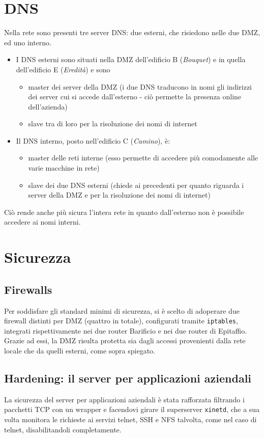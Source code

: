 \documentclass[a4paper,11pt]{article}
\def\code#1{\texttt{#1}}
\begin{document}
\section{DNS}
Nella rete sono presenti tre server DNS: due esterni, che risiedono nelle due DMZ, ed uno interno.\\
\begin{itemize}
\item I DNS esterni sono situati nella DMZ dell'edificio B (\textit{Bouquet}) e in quella dell'edificio E (\textit{Eredità}) e sono 
\begin{itemize}
\item master dei server della DMZ (i due DNS traducono in nomi gli indirizzi dei server cui si accede dall'esterno - ciò permette la presenza online dell'azienda)
\item slave tra di loro per la risoluzione dei nomi di internet
\end{itemize} 
\item Il DNS interno, posto nell'edificio C (\textit{Camino}), è:
\begin{itemize}
\item master delle reti interne (esso permette di accedere più comodamente alle varie macchine in rete)
\item slave dei due DNS esterni (chiede ai precedenti per quanto riguarda i server della DMZ e per la risoluzione dei nomi di internet)
\end{itemize} 
\end{itemize}
Ciò rende anche più sicura l'intera rete in quanto dall'esterno non è possibile accedere ai nomi interni.
\newpage
\section{Sicurezza}
\subsection{Firewalls}
Per soddisfare gli standard minimi di sicurezza, si è scelto di adoperare due firewall distinti per DMZ (quattro in totale), configurati tramite \code{iptables}, integrati rispettivamente nei due router Barificio e nei due router di Epitaffio. \\Grazie ad essi, la DMZ risulta protetta sia dagli accessi provenienti dalla rete locale che da quelli esterni, come sopra spiegato.
\subsection{Hardening: il server per applicazioni aziendali}
La sicurezza del server per applicazioni aziendali è stata rafforzata filtrando i pacchetti TCP con un wrapper e facendovi girare il superserver \code{xinetd}, che a sua volta monitora le richieste ai servizi telnet, SSH e NFS talvolta, come nel caso di telnet, disabilitandoli completamente.
\end{document}
